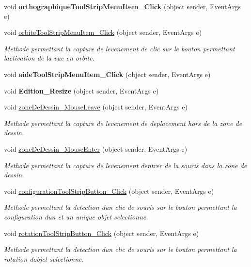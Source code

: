 \begin{DoxyCompactItemize}
void {\bfseries orthographique\+Tool\+Strip\+Menu\+Item\+\_\+\+Click} (object sender, Event\+Args e)
\item 
void \hyperlink{group__inf2990_gaedf3030098782d80e859d3ecd3d54632}{orbite\+Tool\+Strip\+Menu\+Item\+\_\+\+Click} (object sender, Event\+Args e)
\begin{DoxyCompactList}\small\item\em Methode permettant la capture de l\textquotesingle{}evenement de clic sur le bouton permettant l\textquotesingle{}activation de la vue en orbite. \end{DoxyCompactList}\item 
void {\bfseries aide\+Tool\+Strip\+Menu\+Item\+\_\+\+Click} (object sender, Event\+Args e)
\item 
void {\bfseries Edition\+\_\+\+Resize} (object sender, Event\+Args e)
\item 
void \hyperlink{group__inf2990_ga933c5814b41ed563306990ccda747643}{zone\+De\+Dessin\+\_\+\+Mouse\+Leave} (object sender, Event\+Args e)
\begin{DoxyCompactList}\small\item\em Methode permettant la capture de l\textquotesingle{}evenement de deplacement hors de la zone de dessin. \end{DoxyCompactList}\item 
void \hyperlink{group__inf2990_gadaef9c263cc52eda0a5af9f0a1eb424c}{zone\+De\+Dessin\+\_\+\+Mouse\+Enter} (object sender, Event\+Args e)
\begin{DoxyCompactList}\small\item\em Methode permettant la capture de l\textquotesingle{}evenement d\textquotesingle{}entrer de la souris dans la zone de dessin. \end{DoxyCompactList}\item 
void \hyperlink{group__inf2990_ga6e13bc0fa6c65f4dbca05458f89b0a99}{configuration\+Tool\+Strip\+Button\+\_\+\+Click} (object sender, Event\+Args e)
\begin{DoxyCompactList}\small\item\em Methode permettant la detection d\textquotesingle{}un clic de souris sur le bouton permettant la configuration d\textquotesingle{}un et un unique objet selectionne. \end{DoxyCompactList}\item 
void \hyperlink{group__inf2990_gaee07eba375bbbe8902cea6281f08cc53}{rotation\+Tool\+Strip\+Button\+\_\+\+Click} (object sender, Event\+Args e)
\begin{DoxyCompactList}\small\item\em Methode permettant la detection d\textquotesingle{}un clic de souris sur le bouton permettant la rotation d\textquotesingle{}objet selectionne. \end{DoxyCompactList}\item 

\end{DoxyCompactItemize}
